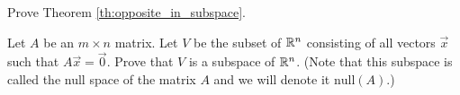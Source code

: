 \documentclass{ximera}
\begin{document}
\begin{problem}\label{prob:opposite_in_subspace}
Prove Theorem \ref{th:opposite_in_subspace}.
\end{problem}

\begin{problem}\label{prob:null(A)_is_subspace}
Let $A$ be an $m \times n$ matrix.  Let $V$ be the subset of $\mathbb{R}^n$ consisting of all vectors $\vec{x}$ such that $A \vec{x} = \vec{0}$.  Prove that $V$ is a subspace of $\mathbb{R}^n$.  (Note that this subspace is called the null space of the matrix $A$ and we will denote it $\mbox{null}(A)$.)
\end{problem}
\end{document}

